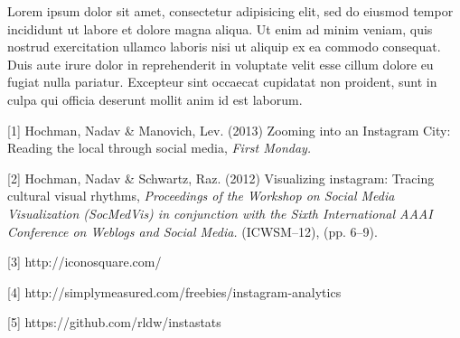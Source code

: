 \documentclass[conference]{acmsiggraph}
\begin{document}
Lorem ipsum dolor sit amet, consectetur adipisicing elit, sed do
eiusmod tempor incididunt ut labore et dolore magna aliqua. Ut enim ad
minim veniam, quis nostrud exercitation ullamco laboris nisi ut
aliquip ex ea commodo consequat. Duis aute irure dolor in
reprehenderit in voluptate velit esse cillum dolore eu fugiat nulla
pariatur. Excepteur sint occaecat cupidatat non proident, sunt in
culpa qui officia deserunt mollit anim id est laborum.


\begin{thebibliography}{10}




  [1] Hochman, Nadav \& Manovich, Lev. (2013) Zooming into an Instagram City: Reading the local through social media,
  \emph{ First Monday.}
  
  [2] Hochman, Nadav \& Schwartz, Raz. (2012) Visualizing instagram: Tracing cultural visual rhythms,
  \emph{Proceedings of the Workshop on Social Media Visualization (SocMedVis) in conjunction with the Sixth International AAAI Conference on Weblogs and Social Media.}
  (ICWSM--12), (pp. 6--9).
  
  [3] http://iconosquare.com/
  
  [4] http://simplymeasured.com/freebies/instagram-analytics
  
  [5] https://github.com/rldw/instastats
  
\end{thebibliography}
\end{document}
